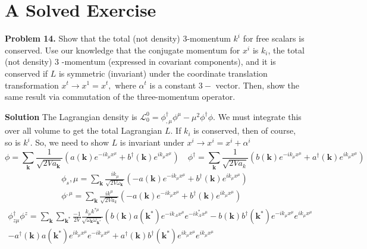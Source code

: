\section{A Solved Exercise}
\textbf{Problem 14.} Show that the total (not density) 3-momentum $k^{i}$ for free scalars is conserved. Use our knowledge that the conjugate momentum for $x^{i}$ is $k_{i}$, the total (not density) 3 -momentum (expressed in covariant components), and it is conserved if $L$ is symmetric (invariant) under the coordinate translation transformation $x^{t} \rightarrow x^{1}=x^{t},$ where $\alpha^{t}$ is a constant $3-$ vector. Then, show the same result via commutation of the three-momentum operator.

\textbf{Solution}
The Lagrangian density is $\mathcal{L}_{0}^{0}=\phi_{, \mu}^{\dagger} \phi^{\mu}-\mu^{2} \phi^{\dagger} \phi .$ We must integrate this over all volume to get the total Lagrangian $L$. If $k_{i}$ is conserved, then of course, so is $k^{i}$. So, we need to show $L$ is invariant under $x^{i} \rightarrow x^{i}=x^{i}+\alpha^{i}$
$$
\phi=\sum_{\mathbf{k}} \frac{1}{\sqrt{2 V a_{\mathbf{k}}}}\left(a(\mathbf{k}) e^{-i k_{\mu} x^{\mu}}+b^{\dagger}(\mathbf{k}) e^{i k_{\mu} x^{\mu}}\right) \quad \phi^{\dagger}=\sum_{\mathbf{k}} \frac{1}{\sqrt{2 V a_{k}}}\left(b(\mathbf{k}) e^{-i k_{\mu} x^{\mu}}+a^{\dagger}(\mathbf{k}) e^{i k_{\mu} x^{\mu}}\right)
$$
$$
\begin{array}{l}
{\phi_{s}, \mu=\sum_{\mathbf{k}} \frac{i k_{\mu}}{\sqrt{2 V \omega_{\mathbf{k}}}}\left(-a(\mathbf{k}) e^{-i k_{\mu} x^{\mu}}+b^{\dagger}(\mathbf{k}) e^{i k_{\mu} x^{\mu}}\right)} \\
{\phi^{, \mu}=\sum_{\mathbf{k}} \frac{i k^{\mu}}{\sqrt{2 V a_{k}}}\left(-a(\mathbf{k}) e^{-i k_{\mu} x^{\mu}}+b^{\dagger}(\mathbf{k}) e^{i k_{\mu} x^{\mu}}\right)}
\end{array}
$$
$$
\begin{aligned}
\phi^{\dagger}_{z \mu} \phi^{z}=\sum_{\mathbf{k}} \sum_{\mathbf{k}^{*}} \frac{-1}{2 V} \frac{k_{\mu} k^{* \mu}}{\sqrt{\omega_{\mathbf{k}} \omega_{\mathbf{k}^{*}}}}\left(b(\mathbf{k}) a\left(\mathbf{k}^{*}\right) e^{-i k_{A} x^{\mu}} e^{-i k_{A}^{*} x^{\mu}}-b(\mathbf{k}) b^{\dagger}\left(\mathbf{k}^{*}\right) e^{-i k_{\mu} x^{\mu}} e^{i k_{\mu} x^{\mu}}\right.\\
-a^{\dagger}(\mathbf{k}) a\left(\mathbf{k}^{*}\right) e^{i k_{\mu} x^{\mu}} e^{-i k_{\mu} x^{\mu}}+a^{\dagger}(\mathbf{k}) b^{\dagger}\left(\mathbf{k}^{*}\right) e^{i k_{\mu} x^{\mu}} e^{i k_{\mu} x^{\mu}}
\end{aligned}
$$
